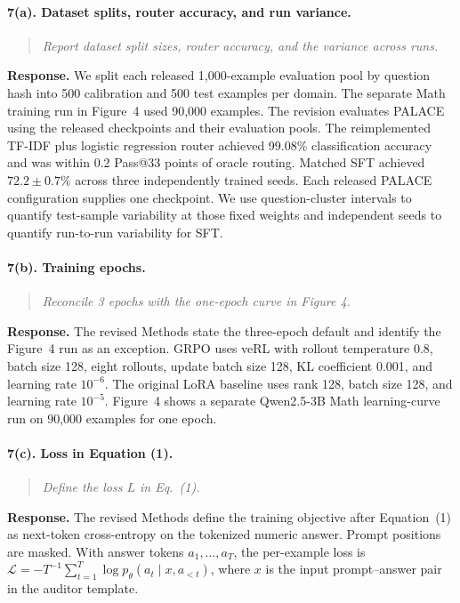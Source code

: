 \documentclass[11pt]{article}
\begin{document}
\paragraph{7(a). Dataset splits, router accuracy, and run variance.}
\begin{quote}\small\itshape Report dataset split sizes, router accuracy, and the variance across runs.\end{quote}
\textbf{Response.} We split each released 1,000-example evaluation pool by question hash into 500 calibration and 500 test examples per domain. The separate Math training run in Figure~4 used 90,000 examples. The revision evaluates PALACE using the released checkpoints and their evaluation pools. The reimplemented TF-IDF plus logistic regression router achieved 99.08\% classification accuracy and was within 0.2 Pass@33 points of oracle routing. Matched SFT achieved \(72.2\pm0.7\%\) across three independently trained seeds. Each released PALACE configuration supplies one checkpoint. We use question-cluster intervals to quantify test-sample variability at those fixed weights and independent seeds to quantify run-to-run variability for SFT.

\paragraph{7(b). Training epochs.}
\begin{quote}\small\itshape Reconcile \emph{3 epochs} with the one-epoch curve in Figure 4.\end{quote}
\textbf{Response.} The revised Methods state the three-epoch default and identify the Figure~4 run as an exception. GRPO uses veRL with rollout temperature 0.8, batch size 128, eight rollouts, update batch size 128, KL coefficient 0.001, and learning rate \(10^{-6}\). The original LoRA baseline uses rank 128, batch size 128, and learning rate \(10^{-5}\). Figure~4 shows a separate Qwen2.5-3B Math learning-curve run on 90,000 examples for one epoch.

\paragraph{7(c). Loss in Equation (1).}
\begin{quote}\small\itshape Define the loss \(L\) in Eq.\ (1).\end{quote}
\textbf{Response.} The revised Methods define the training objective after Equation~(1) as next-token cross-entropy on the tokenized numeric answer. Prompt positions are masked. With answer tokens \(a_1,\ldots,a_T\), the per-example loss is \(\mathcal L=-T^{-1}\sum_{t=1}^{T}\log p_\theta(a_t\mid x,a_{<t})\), where \(x\) is the input prompt--answer pair in the auditor template.
\end{document}
